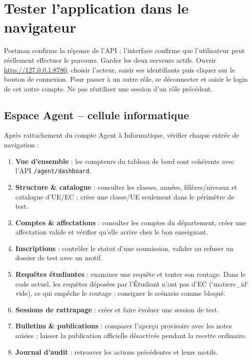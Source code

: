 \documentclass[10pt,a4paper]{article}
\begin{document}
\section{Tester l’application dans le navigateur}

Postman confirme la réponse de l’API ; l’interface confirme que l’utilisateur peut réellement effectuer le parcours. Garder les deux serveurs actifs. Ouvrir \url{http://127.0.0.1:8780}, choisir l’acteur, saisir ses identifiants puis cliquer sur le bouton de connexion. Pour passer à un autre rôle, se déconnecter et saisir le login de cet autre compte. Ne pas réutiliser une session d’un rôle précédent.

\subsection{Espace Agent -- cellule informatique}

Après rattachement du compte Agent à Informatique, vérifier chaque entrée de navigation :
\begin{enumerate}
\item \textbf{Vue d’ensemble} : les compteurs du tableau de bord sont cohérents avec l’API \texttt{/agent/dashboard}.
\item \textbf{Structure \& catalogue} : consulter les classes, années, filières/niveaux et catalogue d’UE/EC ; créer une classe/UE seulement dans le périmètre de test.
\item \textbf{Comptes \& affectations} : consulter les comptes du département, créer une affectation valide et vérifier qu’elle arrive chez le bon enseignant.
\item \textbf{Inscriptions} : contrôler le statut d’une soumission, valider ou refuser un dossier de test avec un motif.
\item \textbf{Requêtes étudiantes} : examiner une requête et tenter son routage. Dans le code actuel, les requêtes déposées par l’Étudiant n’ont pas d’EC (`matiere\_id` vide), ce qui empêche le routage ; consigner le scénario comme bloqué.
\item \textbf{Sessions de rattrapage} : créer et faire évoluer une session de test.
\item \textbf{Bulletins \& publications} : comparer l’aperçu provisoire avec les notes saisies ; laisser la publication officielle désactivée pendant la recette ordinaire.
\item \textbf{Journal d’audit} : retrouver les actions précédentes et leurs motifs.
\end{enumerate}
\end{document}
